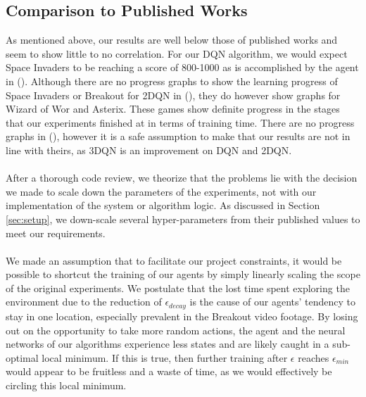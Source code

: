 \subsection{Comparison to Published Works}
As mentioned above, our results are well below those of published works and seem to show little to no correlation. For our DQN algorithm, we would expect Space Invaders to be reaching a score of 800-1000 as is accomplished by the agent in (\citet{human}). Although there are no progress graphs to show the learning progress of Space Invaders or Breakout for 2DQN in (\citet{doubleq}), they do however show graphs for Wizard of Wor and Asterix. These games show definite progress in the stages that our experiments finished at in terms of training time. There are no progress graphs in (\citet{dueling}), however it is a safe assumption to make that our results are not in line with theirs, as 3DQN is an improvement on DQN and 2DQN. \paragraph{}

After a thorough code review, we theorize that the problems lie with the decision we made to scale down the parameters of the experiments, not with our implementation of the system or algorithm logic. As discussed in Section \ref{sec:setup}, we down-scale several hyper-parameters from their published values to meet our requirements. \paragraph{}

We made an assumption that to facilitate our project constraints, it would be possible to shortcut the training of our agents by simply linearly scaling the scope of the original experiments. We postulate that the lost time spent exploring the environment due to the reduction of $\epsilon_{decay}$ is the cause of our agents' tendency to stay in one location, especially prevalent in the Breakout video footage. By losing out on the opportunity to take more random actions, the agent and the neural networks of our algorithms experience less states and are likely caught in a sub-optimal local minimum. If this is true, then further training after $\epsilon$ reaches $\epsilon_{min}$ would appear to be fruitless and a waste of time, as we would effectively be circling this local minimum. \paragraph{}

